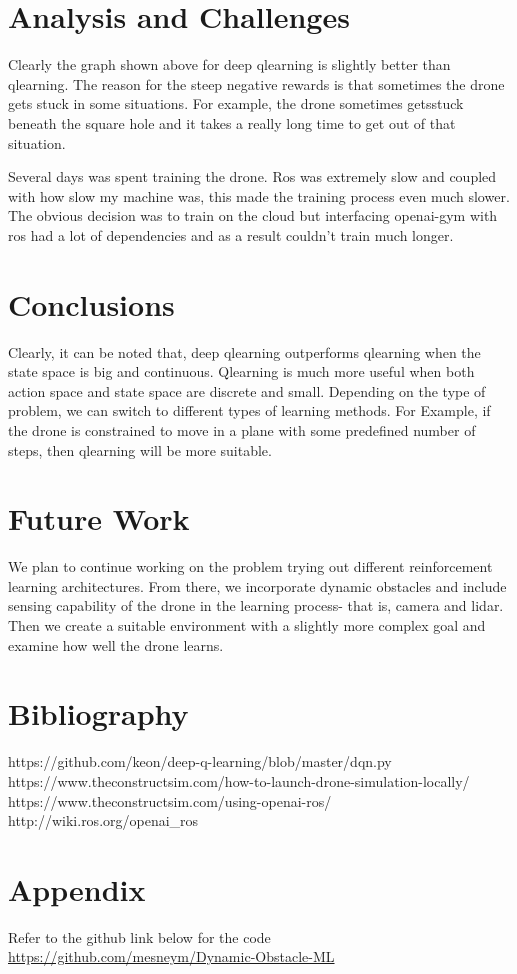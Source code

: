 \documentclass[12pt]{article}
\begin{document}
\section{Analysis and Challenges}
Clearly the graph shown above for deep qlearning is slightly better than qlearning. The reason for  the steep 
negative rewards is that sometimes the drone gets stuck in some situations. For example, the drone sometimes getsstuck beneath the square hole  and it takes a really long time to get out of that situation.

Several days was spent training the drone. Ros was extremely slow and coupled with how slow my machine was,
this made the training process even much slower. The obvious decision was to train on the cloud but interfacing
openai-gym with ros had a lot of dependencies and as a result couldn't train much longer.

\section{Conclusions}
Clearly, it can be noted that, deep qlearning outperforms qlearning when the state space is big and continuous. Qlearning is much more useful
when both action space and state space are discrete and small. Depending on the type of problem, we can switch to different types of learning
methods. For Example, if the drone is constrained to move in a plane with some predefined number of steps, then qlearning will be more suitable.

\section{Future Work}
We plan to continue working on the problem trying out different reinforcement learning architectures. From there, we incorporate 
dynamic obstacles and include sensing capability of the drone in the learning process- that is, camera and lidar. Then we create a suitable
environment with a slightly more complex goal and examine how well the drone learns.
\section{Bibliography}
https://github.com/keon/deep-q-learning/blob/master/dqn.py \\
https://www.theconstructsim.com/how-to-launch-drone-simulation-locally/ \\
https://www.theconstructsim.com/using-openai-ros/
http://wiki.ros.org/openai\_ros

\section{Appendix}
Refer to the github link below for the code \\
\href{https://github.com/mesneym/Dynamic-Obstacle-ML}{https://github.com/mesneym/Dynamic-Obstacle-ML}
\end{document}
